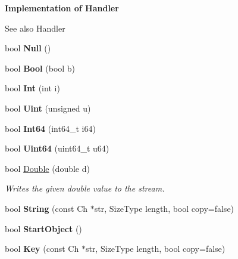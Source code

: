 \begin{Indent}\textbf{ Implementation of Handler}\par
{\em \begin{DoxySeeAlso}{See also}
Handler 
\end{DoxySeeAlso}
}\begin{DoxyCompactItemize}
\item 
\mbox{\label{classWriter_a7d80ac367783ac4eb8b0118924b377bd}} 
bool {\bfseries Null} ()
\item 
\mbox{\label{classWriter_adf126d95f0aec7c2f7667df048227929}} 
bool {\bfseries Bool} (bool b)
\item 
\mbox{\label{classWriter_ae006cfa073c369c57797bc842b817ba4}} 
bool {\bfseries Int} (int i)
\item 
\mbox{\label{classWriter_a20c4edc79c0d5a9402e1deb8f09feadf}} 
bool {\bfseries Uint} (unsigned u)
\item 
\mbox{\label{classWriter_aa63032bf3dce66f817267cc451922a6e}} 
bool {\bfseries Int64} (int64\+\_\+t i64)
\item 
\mbox{\label{classWriter_a71b2ee12ae85d181eb9abdb686565615}} 
bool {\bfseries Uint64} (uint64\+\_\+t u64)
\item 
bool \hyperlink{classWriter_ae80dc830a4f1d84e6eaf6b182c0ceccb}{Double} (double d)
\begin{DoxyCompactList}\small\item\em Writes the given {\ttfamily double} value to the stream. \end{DoxyCompactList}\item 
\mbox{\label{classWriter_ac317eb622ea116293d99e3edffe6f1c3}} 
bool {\bfseries String} (const Ch $\ast$str, Size\+Type length, bool copy=false)
\item 
\mbox{\label{classWriter_a393fe59329dfd8110016183090b02d57}} 
bool {\bfseries Start\+Object} ()
\item 
\mbox{\label{classWriter_a88f8aa2df45426ba81d293ddc71698af}} 
bool {\bfseries Key} (const Ch $\ast$str, Size\+Type length, bool copy=false)

\end{DoxyCompactItemize}
\end{Indent}
